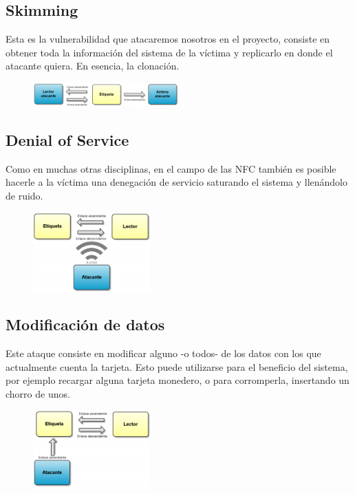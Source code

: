 \subsection{Skimming}
Esta es la vulnerabilidad que atacaremos nosotros en el proyecto, consiste en obtener toda la información del sistema de la víctima y replicarlo en donde el atacante quiera. En esencia, la clonación.
\begin{figure}[!h]
	\centering
	\includegraphics[width=0.5\textwidth]{figures/skimming.png}
\end{figure}
\subsection{Denial of Service}
Como en muchas otras disciplinas, en el campo de las NFC también es posible hacerle a la víctima una denegación de servicio saturando el sistema y llenándolo de ruido.
\begin{figure}[!h]
	\centering
	\includegraphics[width=0.4\textwidth]{figures/dos.png}
\end{figure}
\subsection{Modificación de datos}
Este ataque consiste en modificar alguno -o todos- de los datos con los que actualmente cuenta la tarjeta. Esto puede utilizarse para el beneficio del sistema, por ejemplo recargar alguna tarjeta monedero, o para corromperla, insertando un chorro de unos.
\begin{figure}[!h]
	\centering
	\includegraphics[width=0.4\textwidth]{figures/modificacion.png}
\end{figure}

